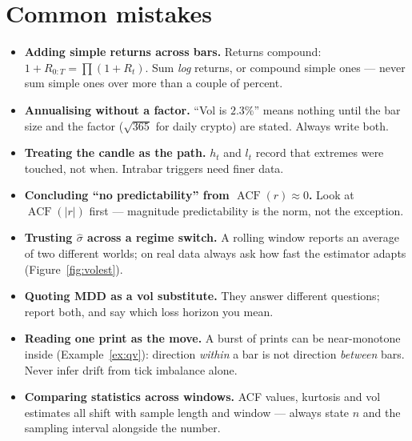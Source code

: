 \section{Common mistakes}
\begin{itemize}
\item \textbf{Adding simple returns across bars.} Returns compound:
$1+R_{0:T}=\prod(1+R_t)$. Sum \emph{log} returns, or compound simple
ones --- never sum simple ones over more than a couple of percent.
\item \textbf{Annualising without a factor.} ``Vol is $2.3\%$'' means
nothing until the bar size and the factor ($\sqrt{365}$ for daily
crypto) are stated. Always write both.
\item \textbf{Treating the candle as the path.} $h_t$ and $l_t$ record
that extremes were touched, not when. Intrabar triggers need finer
data.
\item \textbf{Concluding ``no predictability'' from
$\operatorname{ACF}(r)\approx0$.} Look at $\operatorname{ACF}(|r|)$
first --- magnitude predictability is the norm, not the exception.
\item \textbf{Trusting $\hat\sigma$ across a regime switch.} A rolling
window reports an average of two different worlds; on real data
always ask how fast the estimator adapts (Figure~\ref{fig:volest}).
\item \textbf{Quoting MDD as a vol substitute.} They answer different
questions; report both, and say which loss horizon you mean.
\item \textbf{Reading one print as the move.} A burst of
prints can be near-monotone inside (Example~\ref{ex:qv}): direction
\emph{within} a bar is not direction \emph{between} bars. Never
infer drift from tick imbalance alone.
\item \textbf{Comparing statistics across windows.} ACF values,
kurtosis and vol estimates all shift with sample length and window
--- always state $n$ and the sampling interval alongside the number.
\end{itemize}

